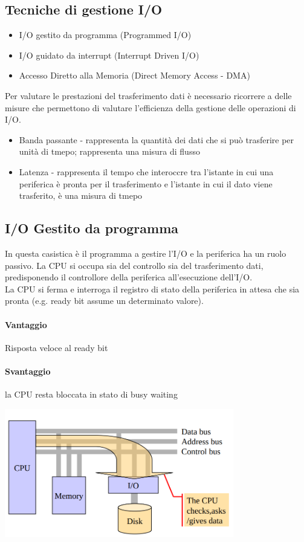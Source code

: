 \documentclass[12pt, a4paper, openany]{book}
\begin{document}
\subsection{Tecniche di gestione I/O}
\begin{itemize}
    \item I/O gestito da programma (Programmed I/O)
    \item I/O guidato da interrupt (Interrupt Driven I/O)
    \item Accesso Diretto alla Memoria (Direct Memory Access - DMA)
\end{itemize}
Per valutare le prestazioni del trasferimento dati è necessario ricorrere a delle misure che permettono
di valutare l'efficienza della gestione delle operazioni di I/O.
\begin{itemize}
    \item Banda passante - rappresenta la quantità dei dati che si può trasferire per unità di tmepo;
    rappresenta una misura di flusso
    \item Latenza - rappresenta il tempo che interoccre tra l'istante in cui una periferica è pronta
    per il trasferimento e l'istante in cui il dato viene trasferito, è una misura di tmepo
\end{itemize}

\subsection*{I/O Gestito da programma}
In questa casistica è il programma a gestire l'I/O e la periferica ha un ruolo passivo.
La CPU si occupa sia del controllo sia del trasferimento dati, predisponendo il controllore
della periferica all'esecuzione dell'I/O. 
\\ La CPU si ferma e interroga il registro di stato della periferica in attesa che sia pronta (e.g.
ready bit assume un determinato valore).
\paragraph*{Vantaggio} Risposta veloce al ready bit
\paragraph*{Svantaggio} la CPU resta bloccata in stato di busy waiting
\begin{center}
    \includegraphics*[width=100mm, scale=0.5]{IO gestito da programma.png}
\end{center}
\end{document}
